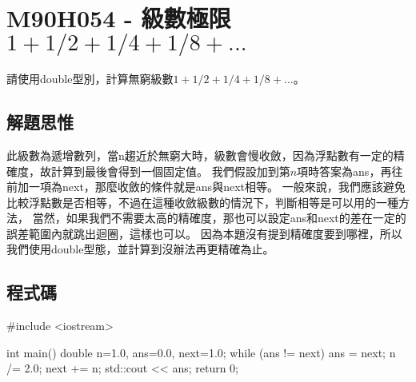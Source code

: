 \section{M90H054 - 級數極限 $1+1/2+1/4+1/8+...$}
\label{M90H054}
請使用double型別，計算無窮級數$1+1/2+1/4+1/8+...$。 

\subsection{解題思惟}
此級數為遞增數列，當n趨近於無窮大時，級數會慢收斂，因為浮點數有一定的精確度，故計算到最後會得到一個固定值。
我們假設加到第$n$項時答案為ans，再往前加一項為next，那麼收斂的條件就是ans與next相等。
一般來說，我們應該避免比較浮點數是否相等，不過在這種收斂級數的情況下，判斷相等是可以用的一種方法，
當然，如果我們不需要太高的精確度，那也可以設定ans和next的差在一定的誤差範圍內就跳出迴圈，這樣也可以。
因為本題沒有提到精確度要到哪裡，所以我們使用double型態，並計算到沒辦法再更精確為止。

\subsection{程式碼}
\begin{cppcode}
	#include <iostream>
	
	int main()
	{
		double n=1.0, ans=0.0, next=1.0;
		while (ans != next) {
			ans = next;
			n /= 2.0;
			next += n; 
		}
		std::cout << ans;
		return 0;
	}
\end{cppcode}
